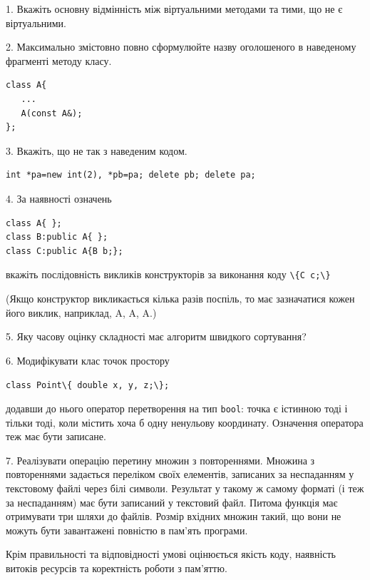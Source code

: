 \documentclass[12pt, ukrainian]{article}
\def\code#1{\Verb!#1!}
\begin{document}
{%
1. Вкажіть основну відмінність між віртуальними методами та тими, що не є віртуальними.%
\par
\vspace{2mm}
2. Максимально змістовно повно сформулюйте назву оголошеного в наведеному фрагменті методу класу.
\vspace{-3mm}
\begin{verbatim}class A{
   ...
   A(const A&);
};\end{verbatim}
\vspace{-3mm}
\par
\vspace{2mm}
3. Вкажіть, що не так з наведеним кодом.
\vspace{-3mm}
\begin{verbatim}int *pa=new int(2), *pb=pa; delete pb; delete pa;\end{verbatim}
\vspace{-3mm}
\par
\vspace{2mm}
4. За наявності означень
\vspace{-3mm}
\begin{verbatim}
class A{ };
class B:public A{ };
class C:public A{B b;};\end{verbatim}
\vspace{-3mm}
вкажіть послідовність викликів конструкторів за виконання коду \code{\{C c;\}} 

(Якщо конструктор викликається кілька разів поспіль, то має зазначатися кожен його виклик, наприклад, A, A, A.)

\vspace{2mm}
5. Яку часову оцінку складності має алгоритм швидкого сортування?
\par
\vspace{2mm}
6. Модифікувати клас точок простору 

\qquad\code{class Point\{ double x, y, z;\};}


додавши до нього оператор перетворення на тип \code{bool}: точка є істинною тоді і тільки тоді, коли містить хоча б одну ненульову координату. Означення оператора теж має бути записане.%
\par
\vspace{2mm}
7. 
Реалізувати операцію перетину множин з повтореннями. Множина з повтореннями задається переліком своїх елементів, записаних за неспаданням у текстовому файлі через білі символи. Результат у такому ж самому форматі (і теж за неспаданням) має бути записаний у текстовий файл. Питома функція має отримувати три шляхи до файлів. Розмір вхідних множин такий, що вони не можуть бути завантажені повністю в пам’ять програми.

Крім правильності та відповідності умові оцінюється якість коду, наявність витоків ресурсів та коректність роботи з пам'яттю. 

}
\end{document}
